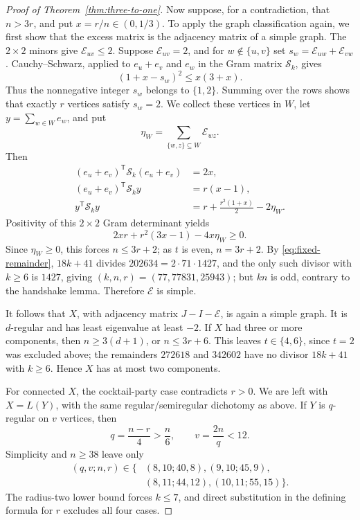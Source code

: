 \documentclass[a4paper,10pt,reqno]{amsart}
\theoremstyle{plain}
\theoremstyle{definition}
\theoremstyle{remark}
\begin{document}
\begin{proof}[Proof of Theorem~\ref{thm:three-to-one}]
Now suppose, for a contradiction, that \(n>3r\), and put
\(x=r/n\in(0,1/3)\). To apply the graph classification again, we first
show that the excess matrix is the adjacency matrix of a simple graph.  The \(2\times2\) minors give
\(\mathcal E_{uv}\le2\).  Suppose \(\mathcal E_{uv}=2\), and for
\(w\notin\{u,v\}\) set \(s_w=\mathcal E_{uw}+\mathcal E_{vw}\).
Cauchy--Schwarz, applied to \(e_u+e_v\) and \(e_w\) in the Gram matrix
\(\mathcal S_k\), gives
\[
 (1+x-s_w)^2\le x(3+x).
\]
Thus the nonnegative integer \(s_w\) belongs to \(\{1,2\}\).  Summing
over the rows shows that exactly \(r\) vertices satisfy \(s_w=2\).
We collect these vertices in \(W\), let \(y=\sum_{w\in W}e_w\), and put
\[
  \eta_W=\sum_{\{w,z\}\subseteq W}\mathcal E_{wz}.
\]
 Then
\[
 \begin{aligned}
  (e_u+e_v)^{\mathsf T}\mathcal S_k(e_u+e_v)&=2x,\\
  (e_u+e_v)^{\mathsf T}\mathcal S_k y&=r(x-1),\\
  y^{\mathsf T}\mathcal S_k y&=r+\frac{r^2(1+x)}2-2\eta_W.
 \end{aligned}
\]
 Positivity of this \(2\times2\) Gram determinant yields
 \[
  2xr+r^2(3x-1)-4x\eta_W\ge0.
 \]
Since \(\eta_W\ge0\), this forces \(n\le3r+2\); as \(t\) is even,
\(n=3r+2\). By \eqref{eq:fixed-remainder}, \(18k+41\) divides
\(202634=2\cdot71\cdot1427\), and the only such divisor with \(k\ge6\) is
\(1427\), giving \((k,n,r)=(77,77831,25943)\); but \(kn\) is odd, contrary to
the handshake lemma.  Therefore \(\mathcal E\) is simple.

It follows that \(X\), with adjacency matrix \(J-I-\mathcal E\), is again a
simple graph. It is \(d\)-regular and has least eigenvalue at least \(-2\).
If \(X\) had three or more components, then \(n\ge3(d+1)\), or
\(n\le3r+6\).  This leaves \(t\in\{4,6\}\), since \(t=2\) was excluded
above; the remainders \(272618\) and \(342602\) have no divisor \(18k+41\)
with \(k\ge6\).  Hence \(X\) has at most two components.

For connected \(X\), the cocktail-party case contradicts \(r>0\).
We are left with \(X=L(Y)\), with the same regular/semiregular
dichotomy as above. If \(Y\) is \(q\)-regular on \(v\) vertices, then
 \[
  q=\frac{n-r}{4}>\frac n6,\qquad v=\frac{2n}{q}<12.
 \]
 Simplicity and \(n\ge38\) leave only
 \[
 \begin{aligned}
  (q,v;n,r)\in\{&(8,10;40,8),(9,10;45,9),\\
                 &(8,11;44,12),(10,11;55,15)\}.
 \end{aligned}
 \]
 The radius-two lower bound forces \(k\le7\), and direct substitution in the
 defining formula for \(r\) excludes all four cases.


\end{proof}
\end{document}
